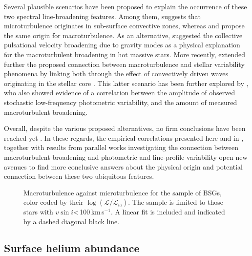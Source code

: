 \documentclass{aa}
\newcommand{\vsini}{\mbox{$v\sin i$}\xspace}
\newcommand{\logLs}{$\log (\mathcal{L}/\mathcal{L}_{\odot})$\xspace}
\newcommand{\kms}{\,\mbox{km\,s$^{-1}$}\xspace}
\begin{document}
Several plausible scenarios have been proposed to explain the occurrence of these two spectral line-broadening features. Among them, \citet{cantiello09} suggests that microturbulence originates in sub-surface convective zones, whereas \citet{grassitelli15a} and \citet{cantiello21} propose the same origin for macroturbulence. As an alternative, \citet{aerts09} suggested the collective pulsational velocity broadening due to gravity modes as a physical explanation for the macroturbulent broadening in hot massive stars. More recently, \citet{aerts15} extended further the proposed connection between macroturbulence and stellar variability phenomena by linking both through the effect of convectively driven waves originating in the stellar core \citep[see also][]{edelmann19, lecoanet23, anders23}. This latter scenario has been further explored by \citet{bowman19a, bowman19b, bowman20b}, who also showed evidence of a correlation between the amplitude of observed stochastic low-frequency photometric variability, and the amount of measured macroturbulent broadening. 

Overall, despite the various proposed alternatives, no firm conclusions have been reached yet \citep[see, e.g.][]{simon-diaz17, godart17, bowman20b, cantiello21}. In these regards, the empirical correlations presented here and in \citet{simon-diaz17}, together with results from parallel works investigating the connection between macroturbulent broadening and photometric and line-profile variability \citep[e.g.][]{simon-diaz10b, simon-diaz17, bowman20b} open new avenues to find more conclusive answers about the physical origin and potential connection between these two ubiquitous features.

\begin{figure}[!t]
\centering
{}
\caption{Macroturbulence against microturbulence for the sample of BSGs, color-coded by their \logLs. The sample is limited to those stars with \vsini<\,100\kms. A linear fit is included and indicated by a dashed diagonal black line.} 
\label{fig:micro_vs_macro}
\end{figure}




\subsection{Surface helium abundance}
\label{subsection:54_tmp}
\end{document}
